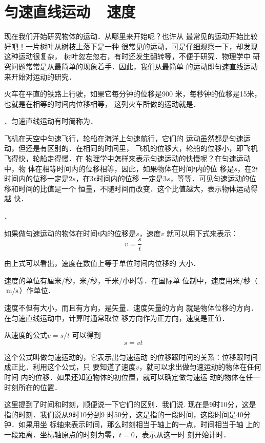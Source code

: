 \section{匀速直线运动~~速度}
    现在我们开始研究物体的运动．从哪里来开始呢？也许从
最常见的运动开始比较好吧！一片树叶从树枝上落下是一种
很常见的运动，可是仔细观察一下，却发现这种运动很复杂，
树叶忽左忽右，有时还发生翻转等，不便于研究．物理学中
研究问题常常是从最简单的现象着手．因此，我们从最简单
的运动即匀速直线运动来开始对运动的研究．

    火车在平直的铁路上行驶，如果它每分钟的位移是900
米，每秒钟的位移是15米，也就是在相等的时间内位移相等，
这列火车所做的运动就是．

．匀速直线运动有时简称为．

    飞机在天空中匀速飞行，轮船在海洋上匀速航行，它们的
运动虽然都是匀速运动，但还是有区别的．在相同的时间里，
飞机的位移大，轮船的位移小，即飞机飞得快，轮船走得慢．在
物理学中怎样来表示匀速运动的快慢呢？在匀速运动中，物
体在相等时间内的位移相等，因此，如果物体在时间$t$内的位
移是$s$，在$2t$时间内的位移一定是$2s$，在$3t$时间内的位移
一定是$3s$，等等．可见匀速运动的位移和时间的比值是一个
恒量，不随时间而改变．这个比值越大，表示物体运动得越
快．

．

如果做匀速运动的物体在时间$t$内的位移是$s$，速度$v$
就可以用下式来表示：
\[v=\frac{s}{t} \]

由上式可以看出，速度在数值上等于单位时间内位移的
大小．

    速度的单位有厘米/秒，米/秒，千米/小时等．在国际单
位制中，速度用米/秒（$\;\text{m}/\text{s}$）作单位．

    速度不但有大小，而且有方向，是矢量．速度矢量的方向
就是物体位移的方向．在匀速直线运动中，计算时通常取位
移方向作为正方向，速度是正值．

从速度的公式$v=s/t$
可以得到
  \[s=vt \]

这个公式叫做匀速运动的，它表示出匀速运动
的位移跟时间的关系：位移跟时间成正比．利用这个公式，只
要知道了速度$v$，就可以求出做匀速运动的物体在任何时间
内的位移．如果还知道物体的初位置，就可以确定做匀速运
动的物体在任一时刻所在的位置．

这里提到了时间和时刻，顺便说一下它们的区别．我们说.
现在是9时10分，这是指的时刻．我们说从9时10分到9
时50分，这是指的一段时间，这段时间是40分钟．如果用坐
标轴来表示时间，那么时刻相当于轴上的一点，时间相当于轴
上的一段距离．坐标轴原点的时刻为零，$t=0$，表示从这一时
刻开始计时．

